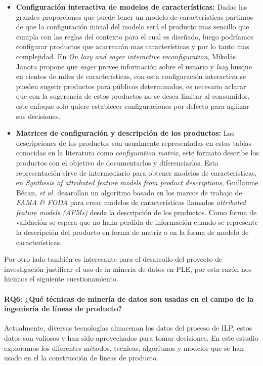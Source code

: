 \begin{itemize}
	\item {\textbf{Configuración interactiva de modelos de características:}}
	Dadas las grandes proporciones que puede tener un modelo de características partimos de que la configuración inicial del modelo será el producto mas sencillo que cumpla con las reglas del contexto para el cual es diseñado, luego podríamos configurar productos que acarrearán mas características y por lo tanto mas complejidad. En \textit{On lazy and eager interactive reconfiguration}\cite{Janota2013}, Mikolás Janota propone que \textit{eager} provee información sobre el usuario y \textit{lazy} busque en cientos de miles de características, con esta configuración interactiva se pueden sugerir productos para públicos determinados, es necesario aclarar que con la sugerencia de estos productos no se desea limitar al consumidor, este enfoque solo quiere establecer configuraciones por defecto para agilizar sus decisiones.
	\item {\textbf{Matrices de configuración y descripción de los productos:}}
	Las descripciones de los productos son usualmente representadas en estas tablas conocidas en la literatura como \textit{configuration matrix}, este formato describe los productos con el objetivo de documentarlos y diferenciarlos. Esta representación sirve de intermediario para obtener modelos de características, en \textit{Synthesis of attributed feature models from product descriptions},  Guillaume Bécan, \textit{et al.} desarollan un algoritmo basado en los marcos de trabajo de \textit{FAMA \& FODA} para crear modelos de características llamados \textit{attributed feature models (AFMs)} desde la descripción de los productos. Como forma de validación se espera que no halla perdida de información cuando se represente la descripción del producto en forma de matriz o en la forma de modelo de características.
\end{itemize}   
Por otro lado también es interesante para el desarrollo del proyecto de investigación justificar el uso de la minería de datos en PLE, por esta razón nos hicimos el siguiente cuestionamiento.
\paragraph{RQ6: ¿Qué técnicas de minería de datos son usadas en el campo de la ingeniería de líneas de producto?}

Actualmente, diversas tecnologías almacenan los datos del proceso de ILP, estos datos son valiosos y han sido aprovechados para tomar decisiones. En este estudio exploramos los diferentes métodos, tecnicas, algoritmos y modelos que se han usado en el la construcción de líneas de producto.

